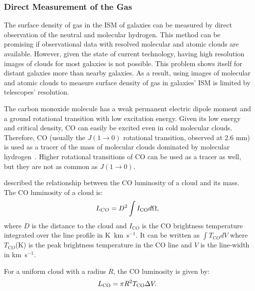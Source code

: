 \subsubsection{Direct Measurement of the Gas}

The surface density of gas in the ISM of galaxies can be measured by direct observation of the neutral and molecular hydrogen.
This method can be promising if observational data with resolved molecular and atomic clouds are available.
However, given the state of current technology, having high resolution images of clouds for most galaxies is not possible. 
This problem shows itself for distant galaxies more than nearby galaxies. 
As a result, using images of molecular and atomic clouds to measure surface density of gas in galaxies' ISM is limited by telescopes' resolution. 
 
The carbon monoxide molecule has a weak permanent electric dipole moment and a ground rotational transition with low excitation energy. 
Given its low energy and critical density, CO can easily be excited even in cold molecular clouds.
Therefore, CO (usually the $J(1\rightarrow 0)$ rotational transition, observed at 2.6 mm) is used as a tracer of the mass of molecular clouds dominated by molecular hydrogen~\citep[e.g.][] {Sanders84}.
Higher rotational transitions of CO can be used as a tracer as well, but they are not as common as $J(1\rightarrow 0)$.

\cite{Young91} described the relationship between the CO luminosity of a cloud and its mass. The CO luminosity of a cloud is:
\begin{equation}
L_{CO} = D^2 \int I_{\rm CO} d\Omega, 
\end{equation}
where $D$ is the distance to the cloud and $I_{\mathrm CO}$ is the CO brightness temperature integrated over the line profile in K~km~s$^{-1}$.
It can be written as ${\int T_{\mathrm CO} dV}$ where $T_{\mathrm CO}$(K) is the peak brightness temperature in the CO line and $V$ is the line-width in km~s$^{-1}$.

For a uniform cloud with a radius $R$, the CO luminosity is given by:
 \begin{equation}
L_{\rm CO} = \pi R^2 T_{\rm CO} \Delta V.
\end{equation}

